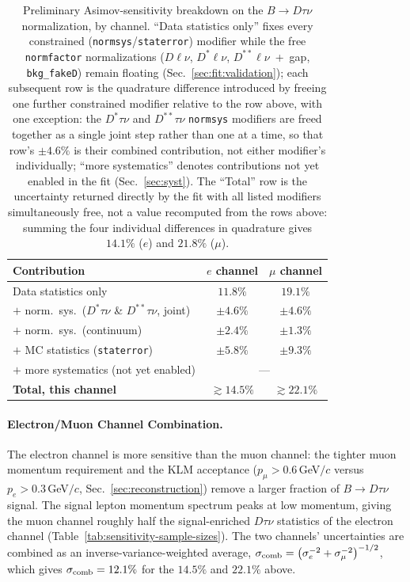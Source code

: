 \begin{table}[htbp]
  \centering
  \caption{Preliminary Asimov-sensitivity breakdown on the $B\to D\tau\nu$
  normalization, by channel. ``Data statistics only'' fixes every
  constrained (\texttt{normsys}/\texttt{staterror}) modifier while the free
  \texttt{normfactor} normalizations ($D\ell\nu$, $D^{*}\ell\nu$,
  $D^{**}\ell\nu$~+~gap, \texttt{bkg\_fakeD}) remain floating
  (Sec.~\ref{sec:fit:validation}); each subsequent row is the quadrature
  difference introduced by freeing one further constrained modifier relative
  to the row above, with one exception: the $D^{*}\tau\nu$ and $D^{**}\tau\nu$
  \texttt{normsys} modifiers are freed together as a single joint step rather
  than one at a time, so that row's $\pm4.6\%$ is their combined
  contribution, not either modifier's individually; ``more systematics''
  denotes contributions not yet enabled in the fit (Sec.~\ref{sec:syst}).
  The ``Total'' row is the uncertainty returned directly by the fit with all
  listed modifiers simultaneously free, not a value recomputed from the rows
  above: summing the four individual differences in quadrature gives
  $14.1\%$ ($e$) and $21.8\%$ ($\mu$).}
  \vspace{2mm}
  \label{tab:sensitivity-breakdown}
  \small
  \begin{tabular}{l c c}
    \hline
    Contribution & $e$ channel & $\mu$ channel \\
    \hline
    Data statistics only & $11.8\%$ & $19.1\%$ \\
    $+$ norm.\ sys.\ ($D^{*}\tau\nu$ \& $D^{**}\tau\nu$, joint) & $\pm 4.6\%$ & $\pm 4.6\%$ \\
    $+$ norm.\ sys.\ (continuum) & $\pm 2.4\%$ & $\pm 1.3\%$ \\
    $+$ MC statistics (\texttt{staterror}) & $\pm 5.8\%$ & $\pm 9.3\%$ \\
    $+$ more systematics (not yet enabled) & \multicolumn{2}{c}{---} \\
    \hline
    \textbf{Total, this channel} & $\gtrsim 14.5\%$ & $\gtrsim 22.1\%$ \\
    \hline
  \end{tabular}
\end{table}


\paragraph{Electron/Muon Channel Combination.}
The electron channel is more sensitive than the muon
channel: the tighter muon momentum requirement and the KLM acceptance ($p_{\mu} > 0.6$\,GeV$/c$
versus $p_{e} > 0.3$\,GeV$/c$, Sec.~\ref{sec:reconstruction}) remove a larger
fraction of $B\to D\tau\nu$ signal. The signal lepton momentum
spectrum peaks at low momentum, giving the muon channel roughly half the
signal-enriched $D\tau\nu$ statistics of the electron channel
(Table~\ref{tab:sensitivity-sample-sizes}).
The two channels' uncertainties are combined as an inverse-variance-weighted
average, $\sigma_{\rm comb} = \left(\sigma_{e}^{-2} +
\sigma_{\mu}^{-2}\right)^{-1/2}$, which gives $\sigma_{\rm comb} = 12.1\%$
for the $14.5\%$ and $22.1\%$ above.

